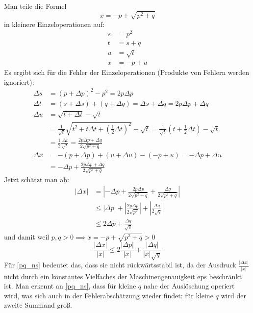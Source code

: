 \documentclass[a4paper]{scrartcl}
\begin{document}
\begin{aufgabe}
	\\Man teile die Formel
	\begin{equation}
		\label{pq_ns}
		x=-p+\sqrt{p^2+q}
	\end{equation} 
	in kleinere Einzeloperationen auf:
	\begin{align*}
		s&=p^2\\
		t&=s +q\\
		u&=\sqrt{t}\\
		x&=-p+u
	\end{align*}
	Es ergibt sich für die Fehler der Einzeloperationen (Produkte von Fehlern werden ignoriert):
	\begin{align*}
		\Delta s&=(p+\Delta p)^2-p^2=2p\Delta p\\
		\Delta t&=(s +\Delta s) + (q +\Delta q) = \Delta s + \Delta q = 2p\Delta p + \Delta q\\
		\Delta u&=\sqrt{t+\Delta t}-\sqrt{t}\\
			    &=\frac 1{\sqrt{t}}\sqrt{t^2+t\Delta t+\left(\frac 12\Delta t\right)^2}-\sqrt{t}
				 =\frac 1{\sqrt{t}}\left(t+\frac 12\Delta t\right)-\sqrt{t}\\
		   &=\frac 12\frac{\Delta t}{\sqrt{t}}
				 =\frac {2p\Delta p+\Delta q}{2\sqrt{p^2+q}}\\
		\Delta x&=-(p+\Delta p)+(u+\Delta u)-(-p+u)
				 =-\Delta p +\Delta u\\
				 &=-\Delta p +\frac {2p\Delta p+\Delta q}{2\sqrt{p^2+q}}
	\end{align*}
	Jetzt schätzt man ab:
	\begin{align*}
		|\Delta x|&=\left|-\Delta p+ \frac {2p\Delta p}{2\sqrt{p^2+q}}+\frac{\Delta q}{2\sqrt{p^2+q}}\right|\\
				   &\le |\Delta p|+\left|\frac{2p\Delta p}{2\sqrt{p^2}}\right|+\left|\frac{\Delta q}{2\sqrt{q}}\right|\\
				   &\le 2\Delta p + \frac {\Delta q}{\sqrt q}
	\end{align*}
	und damit weil $p,q>0 \implies x=-p+\sqrt{p^2+q}>0$
	\[
		\frac{|\Delta x|}{|x|}\le2\frac{|\Delta p|}{|x|}+\frac{|\Delta q|}{|x|\sqrt{q}}
	\]
	Für \eqref{pq_ns} bedeutet das, dass sie nicht rückwärtsstabil ist, da der Ausdruck
	$\frac {|\Delta x|}{|x|}$ nicht durch ein konstantes Vielfaches der Maschinengenauigkeit eps beschränkt ist.
	Man erkennt an \eqref{pq_ns}, dass für kleine $q$ nahe der Auslöschung operiert wird, was sich auch in der Fehlerabschätzung wieder findet: für kleine $q$ wird der zweite Summand groß.
	

\end{aufgabe}
\end{document}
